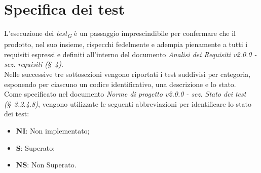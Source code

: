 \section{Specifica dei test}
L'esecuzione dei \textit{test}\textsubscript{\textit{G}} è un passaggio imprescindibile per confermare che il prodotto, nel suo insieme, rispecchi fedelmente e adempia pienamente a tutti i requisiti espressi e definiti all'interno del documento \textit{Analisi dei Requisiti v2.0.0 - sez. requisiti (\S~4)}. \\
Nelle successive tre sottosezioni vengono riportati i test suddivisi per categoria, esponendo per ciascuno un codice identificativo, una descrizione e lo stato. \\
Come specificato nel documento \textit{Norme di progetto v2.0.0 - sez. Stato dei test (\S~3.2.4.8)}, vengono utilizzate le seguenti abbreviazioni per identificare lo stato dei test:
\begin{itemize}
    \item \textbf{NI}: Non implementato;
    \item \textbf{S}: Superato;
    \item \textbf{NS}: Non Superato.
\end{itemize}





